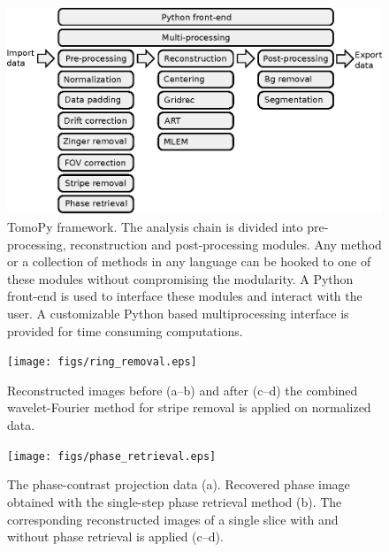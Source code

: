 \documentclass[pdf]{iucr}              %
\begin{document}




\begin{figure}
\centering
\includegraphics[width=\textwidth]{figs/framework1.eps}
\caption{TomoPy framework. The analysis chain is divided into pre-processing, reconstruction and post-processing modules. Any method or a collection of methods in any language can be hooked to one of these modules without compromising the modularity. A Python front-end is used to interface these modules and interact with the user. A customizable Python based multiprocessing interface is provided for time consuming computations.}
\label{fig:Framework}
\end{figure}

\begin{figure}
\centering
\texttt{[image: figs/ring\_removal.eps]}
\caption{Reconstructed images before (a--b) and after (c--d) the combined wavelet-Fourier method for stripe removal is applied on normalized data.}
\label{fig:ProcessRing}
\end{figure}

\begin{figure}
\centering
\texttt{[image: figs/phase\_retrieval.eps]}
\caption{The phase-contrast projection data (a). Recovered phase image obtained with the single-step phase retrieval method (b). The corresponding reconstructed images of a single slice with and without phase retrieval is applied (c--d).}
\label{fig:ProcessPhase}
\end{figure}
\end{document}
